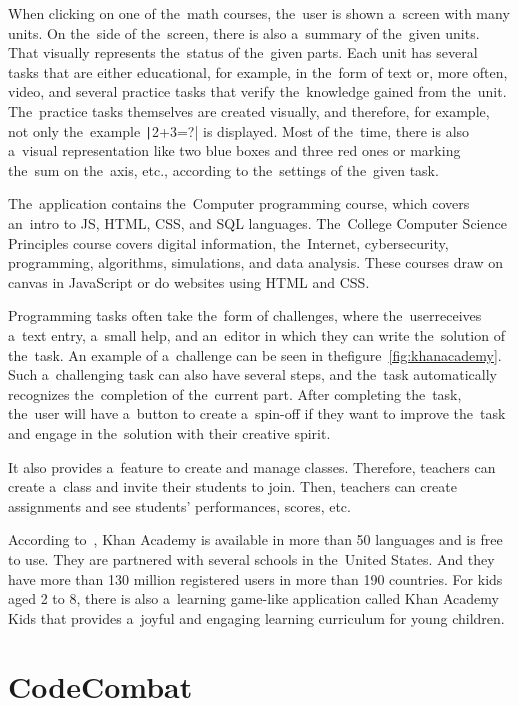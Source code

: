 \pagebreak
When clicking on one of the~math courses, the~user is shown a~screen with many units.
On the~side of the~screen, there is also a~summary of the~given units.
That visually represents the~status of the~given parts.
Each unit has several tasks that are either educational, for example, in the~form of text or, more often, video, and several practice tasks that verify the~knowledge gained from the~unit.
The~practice tasks themselves are created visually, and therefore, for example, not only the~example \texttt|2+3=?| is displayed.
Most of the~time, there is also a~visual representation like two blue boxes and three red ones or marking the~sum on the~axis, etc., according to the~settings of the~given task.

The~application contains the~Computer programming course, which covers an~intro to JS, HTML, CSS, and SQL languages.
The~College Computer Science Principles course covers digital information, the~Internet, cybersecurity, programming, algorithms, simulations, and data analysis.
These courses draw on canvas in JavaScript or do websites using HTML and CSS.

Programming tasks often take the~form of challenges, where the~user\linebreak{}receives a~text entry, a~small help, and an~editor in which they can write the~solution of the~task.
An example of a~challenge can be seen in the\linebreak{}figure~\ref{fig:khanacademy}.
Such a~challenging task can also have several steps, and the~task automatically recognizes the~completion of the~current part.
After completing the~task, the~user will have a~button to create a~spin-off if they want to improve the~task and engage in the~solution with their creative spirit.

It also provides a~feature to create and manage classes.
Therefore, teachers can create a~class and invite their students to join.
Then, teachers can create assignments and see students' performances, scores, etc.

According to~\cite{a2022_khan}, Khan Academy is available in more than 50 languages and is free to use.
They are partnered with several schools in the~United States.
And they have more than 130 million registered users in more than 190 countries.
For kids aged 2 to 8, there is also a~learning game-like application called Khan Academy Kids that provides a~joyful and engaging learning curriculum for young children.

\section{CodeCombat}
\label{similar-games:code-combat}

